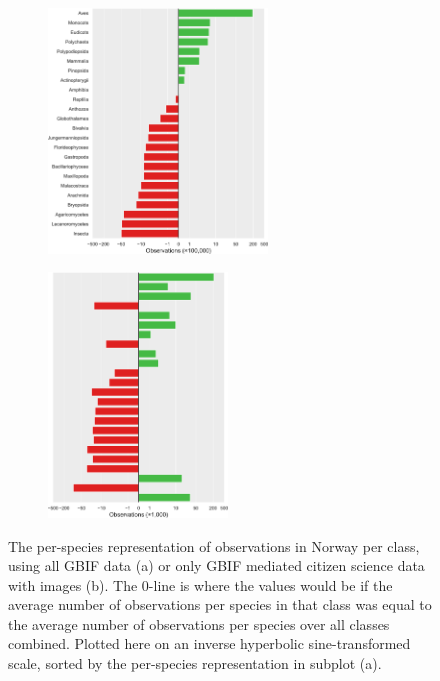 \documentclass{article}
\begin{document}
\begin{figure}
  \centering
  \begin{subfigure}[b]{0.4\textwidth}
      \centering
      \includegraphics[height=6.5cm]{1a}
      \caption{}
      \label{fig:bias_a}
  \end{subfigure}
  \hfill
  \begin{subfigure}[b]{0.4\textwidth}
      \centering
      \includegraphics[height=6.5cm]{1b}
      \caption{}
      \label{fig:bias_b}
  \end{subfigure}
  \caption{\footnotesize The per-species representation of observations in Norway per class, using all GBIF data (a) or only GBIF mediated citizen science data with images (b). The 0-line is where the values would be if the average number of observations per species in that class was equal to the average number of observations per species over all classes combined. Plotted here on an inverse hyperbolic sine-transformed scale, sorted by the per-species representation in subplot (a).}
     \label{fig:bias}
\end{figure}
\end{document}
